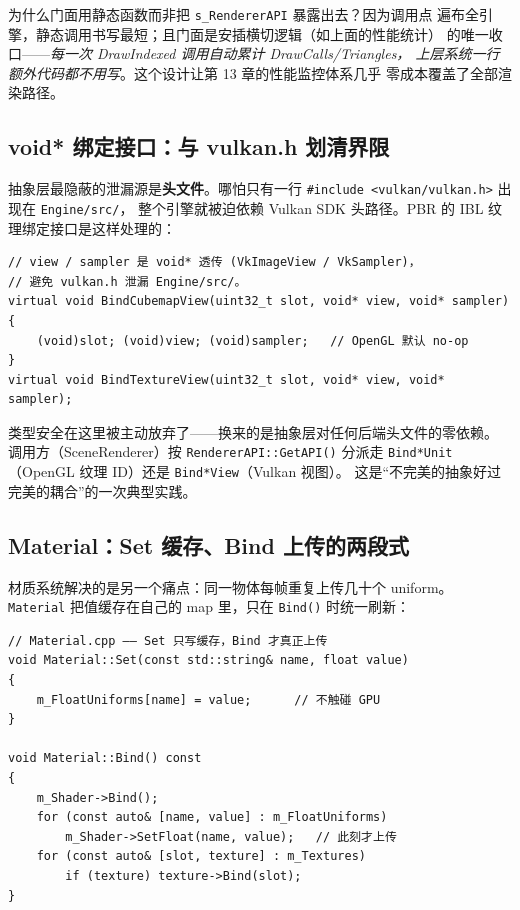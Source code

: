 为什么门面用静态函数而非把 \texttt{s\_RendererAPI} 暴露出去？因为调用点
遍布全引擎，静态调用书写最短；且门面是安插横切逻辑（如上面的性能统计）
的唯一收口——\emph{每一次 DrawIndexed 调用自动累计 DrawCalls/Triangles，
上层系统一行额外代码都不用写}。这个设计让第 13 章的性能监控体系几乎
零成本覆盖了全部渲染路径。

\subsection{void* 绑定接口：与 vulkan.h 划清界限}

抽象层最隐蔽的泄漏源是\textbf{头文件}。哪怕只有一行
\texttt{\#include <vulkan/vulkan.h>} 出现在 \texttt{Engine/src/}，
整个引擎就被迫依赖 Vulkan SDK 头路径。PBR 的 IBL 纹理绑定接口是这样处理的：

\begin{lstlisting}
// view / sampler 是 void* 透传 (VkImageView / VkSampler)，
// 避免 vulkan.h 泄漏 Engine/src/。
virtual void BindCubemapView(uint32_t slot, void* view, void* sampler)
{
    (void)slot; (void)view; (void)sampler;   // OpenGL 默认 no-op
}
virtual void BindTextureView(uint32_t slot, void* view, void* sampler);
\end{lstlisting}

类型安全在这里被主动放弃了——换来的是抽象层对任何后端头文件的零依赖。
调用方（SceneRenderer）按 \texttt{RendererAPI::GetAPI()} 分派走
\texttt{Bind*Unit}（OpenGL 纹理 ID）还是 \texttt{Bind*View}（Vulkan 视图）。
这是``不完美的抽象好过完美的耦合''的一次典型实践。

\subsection{Material：Set 缓存、Bind 上传的两段式}

材质系统解决的是另一个痛点：同一物体每帧重复上传几十个 uniform。
\texttt{Material} 把值缓存在自己的 map 里，只在 \texttt{Bind()} 时统一刷新：

\begin{lstlisting}
// Material.cpp —— Set 只写缓存，Bind 才真正上传
void Material::Set(const std::string& name, float value)
{
    m_FloatUniforms[name] = value;      // 不触碰 GPU
}

void Material::Bind() const
{
    m_Shader->Bind();
    for (const auto& [name, value] : m_FloatUniforms)
        m_Shader->SetFloat(name, value);   // 此刻才上传
    for (const auto& [slot, texture] : m_Textures)
        if (texture) texture->Bind(slot);
}
\end{lstlisting}


